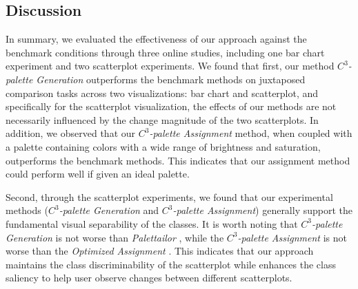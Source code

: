 {\subsection{Discussion}
\label{subsec:discussionEval}
In summary, we evaluated the effectiveness of our approach against the benchmark conditions through three online studies, including one bar chart experiment and two scatterplot experiments.
We found that first, our method \emph{$C^3$-palette Generation} outperforms the benchmark methods on juxtaposed comparison tasks across two visualizations: bar chart and scatterplot, and specifically for the scatterplot visualization, the effects of our methods are not necessarily influenced by the change magnitude of the two scatterplots.
In addition, we observed that our \emph{$C^3$-palette Assignment} method, when coupled with a palette containing colors with a wide range of brightness and saturation, outperforms the benchmark methods. This indicates that our assignment method could perform well if given an ideal palette.

Second, through the scatterplot experiments, we found that our experimental methods (\emph{$C^3$-palette Generation} and \emph{$C^3$-palette Assignment}) generally support the fundamental visual separability of the classes. It is worth noting that \emph{$C^3$-palette Generation} is not worse than \emph{Palettailor}
, while the \emph{$C^3$-palette Assignment} is not worse than the \emph{Optimized Assignment}
. This indicates that our approach maintains the class discriminability of the scatterplot while enhances the class saliency to help user observe changes between different scatterplots.

}
